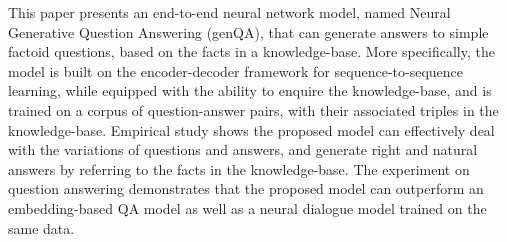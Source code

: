 This paper presents an end-to-end neural network model, named Neural Generative Question Answering (genQA), that can generate answers to simple factoid questions, based on the facts in a knowledge-base. More specifically, the model is built on the encoder-decoder framework for sequence-to-sequence learning, while equipped with the ability to enquire the knowledge-base, and is trained on a corpus of question-answer pairs, with their associated triples in the knowledge-base. Empirical study shows the proposed model can effectively deal with the variations of questions and answers, and generate right and natural answers by referring to the facts in the knowledge-base. The experiment on question answering demonstrates that the proposed model can outperform an embedding-based QA model as well as a neural dialogue model trained on the same data.
